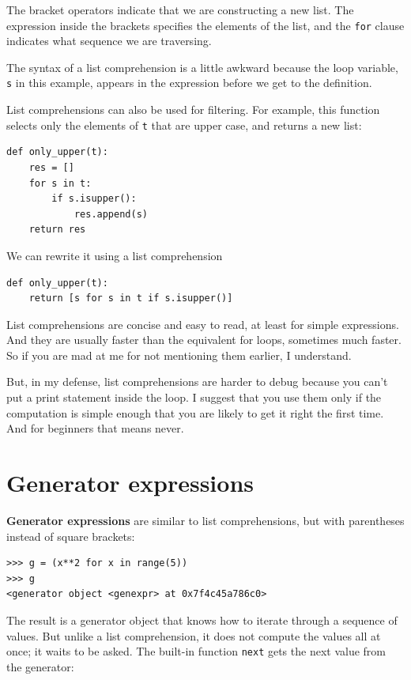 \documentclass[10pt]{book}
\begin{document}
The bracket operators indicate that we are constructing a new
list.  The expression inside the brackets specifies the elements
of the list, and the {\tt for} clause indicates what sequence
we are traversing.

The syntax of a list comprehension is a little awkward because
the loop variable, {\tt s} in this example, appears in the expression
before we get to the definition.

List comprehensions can also be used for filtering.  For example,
this function selects only the elements of {\tt t} that are
upper case, and returns a new list:

\begin{verbatim}
def only_upper(t):
    res = []
    for s in t:
        if s.isupper():
            res.append(s)
    return res
\end{verbatim}

We can rewrite it using a list comprehension

\begin{verbatim}
def only_upper(t):
    return [s for s in t if s.isupper()]
\end{verbatim}

List comprehensions are concise and easy to read, at least for simple
expressions.  And they are usually faster than the equivalent for
loops, sometimes much faster.  So if you are mad at me for not
mentioning them earlier, I understand.

But, in my defense, list comprehensions are harder to debug because
you can't put a print statement inside the loop.  I suggest that you
use them only if the computation is simple enough that you are likely
to get it right the first time.  And for beginners that means never.



\section{Generator expressions}

{\bf Generator expressions} are similar to list comprehensions, but
with parentheses instead of square brackets:

\begin{verbatim}
>>> g = (x**2 for x in range(5))
>>> g
<generator object <genexpr> at 0x7f4c45a786c0>
\end{verbatim}
%
The result is a generator object that knows how to iterate through
a sequence of values.  But unlike a list comprehension, it does not
compute the values all at once; it waits to be asked.  The built-in
function {\tt next} gets the next value from the generator:
\end{document}
